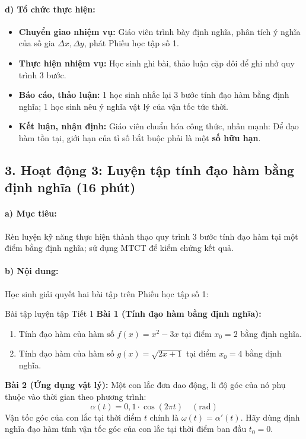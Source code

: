 \documentclass[12pt, a4paper]{article}
\begin{document}
\paragraph{d) Tổ chức thực hiện:}
\begin{itemize}[leftmargin=0.8cm]
    \item \textbf{Chuyển giao nhiệm vụ:} Giáo viên trình bày định nghĩa, phân tích ý nghĩa của số gia $\Delta x, \Delta y$, phát Phiếu học tập số 1.
    \item \textbf{Thực hiện nhiệm vụ:} Học sinh ghi bài, thảo luận cặp đôi để ghi nhớ quy trình 3 bước.
    \item \textbf{Báo cáo, thảo luận:} 1 học sinh nhắc lại 3 bước tính đạo hàm bằng định nghĩa; 1 học sinh nêu ý nghĩa vật lý của vận tốc tức thời.
    \item \textbf{Kết luận, nhận định:} Giáo viên chuẩn hóa công thức, nhấn mạnh: Để đạo hàm tồn tại, giới hạn của tỉ số bắt buộc phải là một \textbf{số hữu hạn}.
\end{itemize}

\subsection*{3. Hoạt động 3: Luyện tập tính đạo hàm bằng định nghĩa (16 phút)}

\paragraph{a) Mục tiêu:} Rèn luyện kỹ năng thực hiện thành thạo quy trình 3 bước tính đạo hàm tại một điểm bằng định nghĩa; sử dụng MTCT để kiểm chứng kết quả.

\paragraph{b) Nội dung:} Học sinh giải quyết hai bài tập trên Phiếu học tập số 1:

\begin{pedabox}{Bài tập luyện tập Tiết 1}
\textbf{Bài 1 (Tính đạo hàm bằng định nghĩa):}
\begin{enumerate}[leftmargin=0.6cm]
    \item[a)] Tính đạo hàm của hàm số $f(x) = x^2 - 3x$ tại điểm $x_0 = 2$ bằng định nghĩa.
    \item[b)] Tính đạo hàm của hàm số $g(x) = \sqrt{2x + 1}$ tại điểm $x_0 = 4$ bằng định nghĩa.
\end{enumerate}

\textbf{Bài 2 (Ứng dụng vật lý):} Một con lắc đơn dao động, li độ góc của nó phụ thuộc vào thời gian theo phương trình:
$$\alpha(t) = 0{,}1 \cdot \cos(2\pi t) \quad (\text{rad})$$
Vận tốc góc của con lắc tại thời điểm $t$ chính là $\omega(t) = \alpha'(t)$. Hãy dùng định nghĩa đạo hàm tính vận tốc góc của con lắc tại thời điểm ban đầu $t_0 = 0$.
\end{pedabox}
\end{document}

